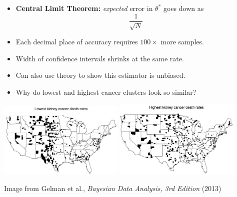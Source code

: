 \documentclass[10pt]{report}
\begin{document}
%
\begin{itemize}
\item {\bfseries Central Limit Theorem:}  \emph{expected} error in $\theta^*$ goes down as
{\Large
\[
\frac{1}{\sqrt{N}}
\]
}
\item Each decimal place of accuracy requires $100 \times$ more samples.
\item Width of confidence intervals shrinks at the same rate.
\vfill
\item Can also use theory to show this estimator is unbiased.
\end{itemize}


%
\begin{itemize}
\item Why do lowest and highest cancer clusters look so similar?
\end{itemize}
\vspace*{1pt}
\begin{center}
\hfill
\includegraphics[width=0.45\textwidth]{img/low-cancer.jpg}
\hfill
\includegraphics[width=0.45\textwidth]{img/high-cancer.jpg}
\hfill
\end{center}
\vfill
\hfill {\tiny Image from Gelman et al., {\slshape Bayesian Data Analysis, 3rd Edition} (2013)}
\end{document}
